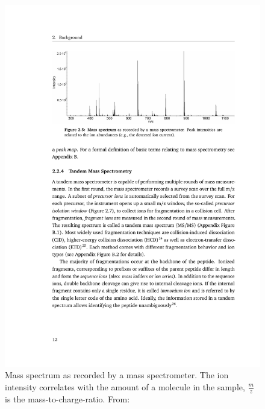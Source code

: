 	\begin{figure}
		\normalsize
		\centering
		\includegraphics[width = \textwidth, trim=3.9cm 20cm 2.5cm 3cm,clip]{figures/Grafik_Timo.pdf}
		\caption[Example of a mass spectrum]{Mass spectrum as recorded by a mass spectrometer. The ion intensity correlates with the amount of a molecule in the sample, $\frac{m}{z}$ is the mass-to-charge-ratio. From:~\citet{Sachsenberg2017}}
		\label{fig:mass_spectrum}
	\end{figure}
	\renewcommand{\baselinestretch}{1}
	\newpage
